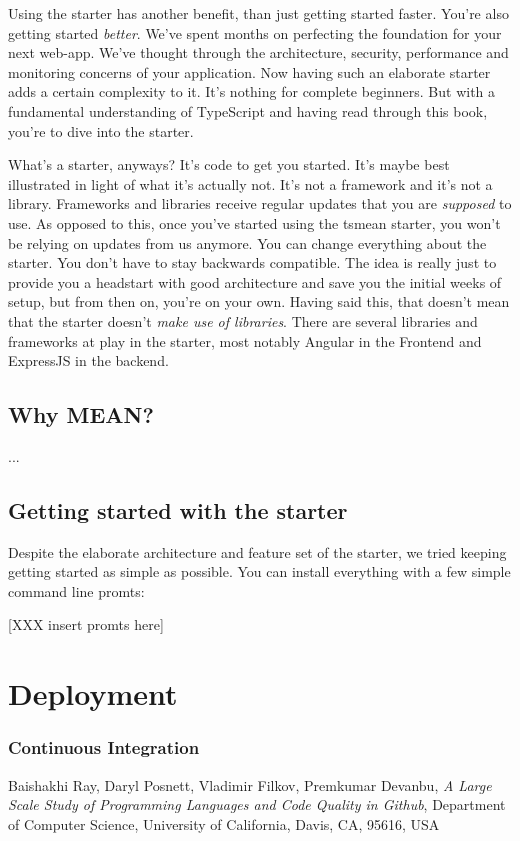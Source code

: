 \documentclass[12pt,a4paper]{report}
\begin{document}
Using the starter has another benefit, than just getting started faster. You're also getting started \textit{better}. We've spent months on perfecting the foundation for your next web-app. We've thought through the architecture, security, performance and monitoring concerns of your application. Now having such an elaborate starter adds a certain complexity to it. It's nothing for complete beginners. But with a fundamental understanding of TypeScript and having read through this book, you're to dive into the starter.

What's a starter, anyways? It's code to get you started. It's maybe best illustrated in light of what it's actually not. It's not a framework and it's not a library. Frameworks and libraries receive regular updates that you are \textit{supposed} to use. As opposed to this, once you've started using the tsmean starter, you won't be relying on updates from us anymore. You can change everything about the starter. You don't have to stay backwards compatible. The idea is really just to provide you a headstart with good architecture and save you the initial weeks of setup, but from then on, you're on your own. Having said this, that doesn't mean that the starter doesn't \textit{make use of libraries}. There are several libraries and frameworks at play in the starter, most notably Angular in the Frontend and ExpressJS in the backend.

\section{Why MEAN?}
...

\section {Getting started with the starter}
Despite the elaborate architecture and feature set of the starter, we tried keeping getting started as simple as possible. You can install everything with a few simple command line promts:

[XXX insert promts here]

\chapter{Deployment}

\subsection{Continuous Integration}


\begin{thebibliography}{9}

  Baishakhi Ray, Daryl Posnett, Vladimir Filkov, Premkumar Devanbu,
  \textit{A Large Scale Study of Programming Languages
and Code Quality in Github},
  Department of Computer Science, University of California, Davis, CA, 95616, USA

\end{thebibliography}
\end{document}
